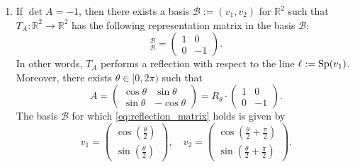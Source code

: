 \begin{proposition}
\begin{enumerate}
    \item If $\det A = -1$, then there exists a basis $\mathcal{B} := (v_1, v_2)$ for $\mathbb{R}^2$ such that $T_A \colon \mathbb{R}^2 \to \mathbb{R}^2$ has the following representation matrix in the basis $\mathcal{B}$:
    \begin{equation}
        [T_A]_{\mathcal{B}}^{\mathcal{B}} = \begin{pmatrix} 1 & 0 \\ 0 & -1 \end{pmatrix}. \label{eq:reflection_matrix}
    \end{equation}
    In other words, $T_A$ performs a reflection with respect to the line $\ell := \operatorname{Sp}(v_1)$.
    Moreover, there exists $\theta \in [0, 2\pi)$ such that
    \[ A = \begin{pmatrix} \cos\theta & \sin\theta \\ \sin\theta & -\cos\theta \end{pmatrix} = R_\theta \cdot \begin{pmatrix} 1 & 0 \\ 0 & -1 \end{pmatrix}. \]
    The basis $\mathcal{B}$ for which \eqref{eq:reflection_matrix} holds is given by 
    \[ v_1 = \begin{pmatrix} \cos\left(\frac{\theta}{2}\right) \\ \sin\left(\frac{\theta}{2}\right) \end{pmatrix}, \quad v_2 = \begin{pmatrix} \cos\left(\frac{\theta}{2} + \frac{\pi}{2}\right) \\ \sin\left(\frac{\theta}{2} + \frac{\pi}{2}\right) \end{pmatrix}. \]
\end{enumerate}
\end{proposition}

